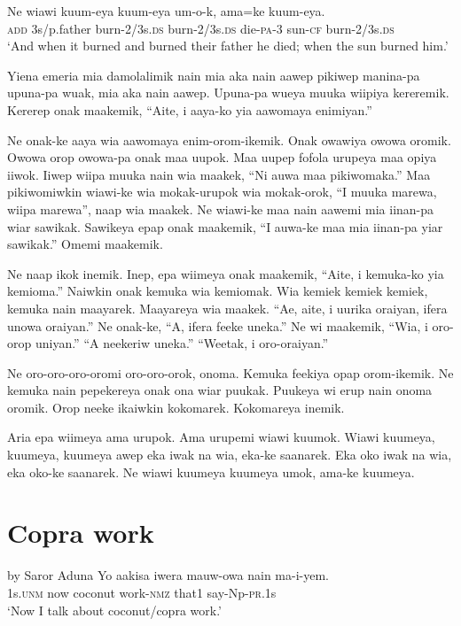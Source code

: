 \ea
\gll  Ne  wiawi  kuum-eya  kuum-eya  um-o-k,  ama=ke  kuum-eya. \\
\textsc{add}  3s/p.father  burn-2/3s.\textsc{ds}  burn-2/3s.\textsc{ds}  die-\textsc{pa}-3  sun-\textsc{cf}  burn-2/3s.\textsc{ds} \\
\glt ‘And when it burned and burned their father he died; when the sun burned him.’ \\
\z

Yiena emeria mia damolalimik nain mia aka nain aawep pikiwep manina-pa upuna-pa wuak, mia aka nain aawep. 
Upuna-pa wueya muuka wiipiya kereremik. 
Kererep onak maakemik, “Aite, i aaya-ko yia aawomaya enimiyan.”

Ne onak-ke aaya wia aawomaya enim-orom-ikemik. 
Onak owawiya owowa oromik. 
Owowa orop owowa-pa onak maa uupok. 
Maa uupep fofola urupeya maa opiya iiwok. 
Iiwep wiipa muuka nain wia maakek, “Ni auwa maa pikiwomaka.” 
Maa pikiwomiwkin wiawi-ke wia mokak-urupok wia mokak-orok,  “I muuka marewa, wiipa marewa”, naap wia maakek. 
Ne wiawi-ke maa nain aawemi mia iinan-pa wiar sawikak. 
Sawikeya epap onak maakemik, “I auwa-ke maa mia iinan-pa yiar sawikak.” 
Omemi maakemik. 

Ne naap ikok inemik. 
Inep, epa wiimeya onak maakemik, “Aite, i kemuka-ko yia kemioma.” 
Naiwkin onak kemuka wia kemiomak. 
Wia kemiek kemiek kemiek, kemuka nain maayarek. 
Maayareya wia maakek.
“Ae, aite, i uurika oraiyan, ifera unowa oraiyan.” 
Ne onak-ke, “A, ifera feeke uneka.” 
Ne wi maakemik, “Wia, i oro-orop uniyan.” 
“A neekeriw uneka.” 
“Weetak, i oro-oraiyan.”

Ne oro-oro-oro-oromi oro-oro-orok, onoma. 
Kemuka feekiya opap orom-ikemik. 
Ne kemuka nain pepekereya onak ona wiar puukak. 
Puukeya wi erup nain onoma oromik. 
Orop neeke ikaiwkin kokomarek. 
Kokomareya inemik.

Aria epa wiimeya ama urupok. 
Ama urupemi wiawi kuumok. 
Wiawi kuumeya, kuumeya, kuumeya awep eka iwak na wia, eka-ke saanarek. 
Eka oko iwak na wia, eka oko-ke saanarek. 
Ne wiawi kuumeya kuumeya umok, ama-ke kuumeya. 


\section{Copra work}\label{app:2:copra} 
by Saror Aduna 
\ea
\gll  Yo  aakisa  iwera  mauw-owa  nain  ma-i-yem. \\
1s.\textsc{unm}  now  coconut  work-\textsc{nmz}  that1  say-Np-\textsc{pr}.1s \\ 
\glt ‘Now I talk about coconut/copra work.’ \\
\z


